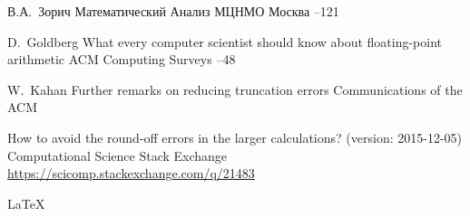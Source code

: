 \documentclass{article}
\theoremstyle{definition}
\begin{document}
\begin{thebibliography}{99}
\by В.А.~Зорич
\inbook Математический Анализ
\publ МЦНМО
\publaddr Москва
--121

\by D.~Goldberg
\paper What every computer scientist should know about floating-point arithmetic
\jour ACM Computing Surveys
--48


\by W.~Kahan
\paper Further remarks on reducing truncation errors
\jour Communications of the ACM

\eprint How to avoid the round-off errors in the larger calculations?
\eprintinfo (version: 2015-12-05)
\by Computational Science Stack Exchange
\elink \href{https://scicomp.stackexchange.com/q/21483}{https://scicomp.stackexchange.com/q/21483}

\end{thebibliography}
\begin{center} \Large
\LaTeX
\end{center}
\end{document}
